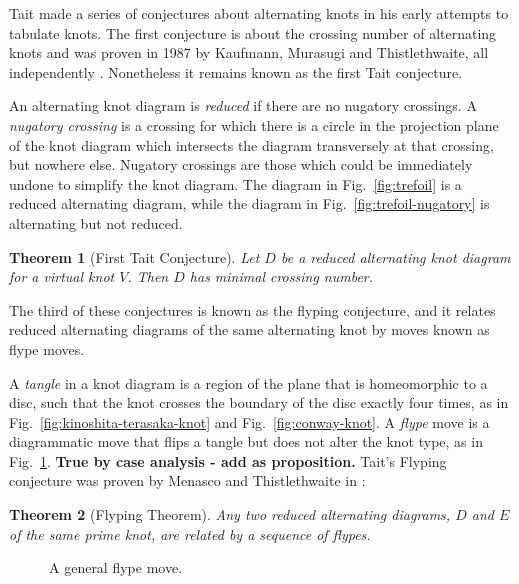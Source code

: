 \documentclass[12pt]{report}
\newcommand{\notered}[1]{{\color{Red} \textbf{#1}}}
\newtheorem*{theorem}{Theorem}
\theoremstyle{upright}
\begin{document}
Tait made a series of conjectures about alternating knots in his early attempts to tabulate knots. The first conjecture is about the crossing number of alternating knots and was proven in 1987 by Kaufmann, Murasugi and Thistlethwaite, all independently \cite{state-models-jones-polynomial, jones-polynomials-classical-conjectures, spanning-tree-expansion-jones-polynomial}. Nonetheless it remains known as the first Tait conjecture.

An alternating knot diagram is \textit{reduced} if there are no nugatory crossings. A \textit{nugatory crossing} is a crossing for which there is a circle in the projection plane of the knot diagram which intersects the diagram transversely at that crossing, but nowhere else. Nugatory crossings are those which could be immediately undone to simplify the knot diagram. The diagram in Fig.~\ref{fig:trefoil} is a reduced alternating diagram, while the diagram in Fig.~\ref{fig:trefoil-nugatory} is alternating but not reduced.

\begin{theorem}[First Tait Conjecture]
Let $D$ be a reduced alternating knot diagram for a virtual knot $V$. Then $D$ has minimal crossing number.
\end{theorem}

The third of these conjectures is known as the flyping conjecture, and it relates reduced alternating diagrams of the same alternating knot by moves known as flype moves.

A \textit{tangle} in a knot diagram is a region of the plane that is homeomorphic to a disc, such that the knot crosses the boundary of the disc exactly four times, as in Fig.~\ref{fig:kinoshita-terasaka-knot} and Fig.~\ref{fig:conway-knot}. A \textit{flype} move is a diagrammatic move that flips a tangle but does not alter the knot type, as in Fig.~\ref{fig:flype}. \notered{True by case analysis - add as proposition.} Tait's Flyping conjecture was proven by Menasco and Thistlethwaite in \cite[p. 166]{classification-alternating-links}:

\begin{theorem}[Flyping Theorem]
Any two reduced alternating diagrams, $D$ and $E$ of the same prime knot, are related by a sequence of flypes.
\end{theorem}

\begin{figure}[hbt]
	\centering
	\def\svgscale{0.5}
	
	\caption{A general flype move.}
	\label{fig:flype}
\end{figure}
\end{document}
